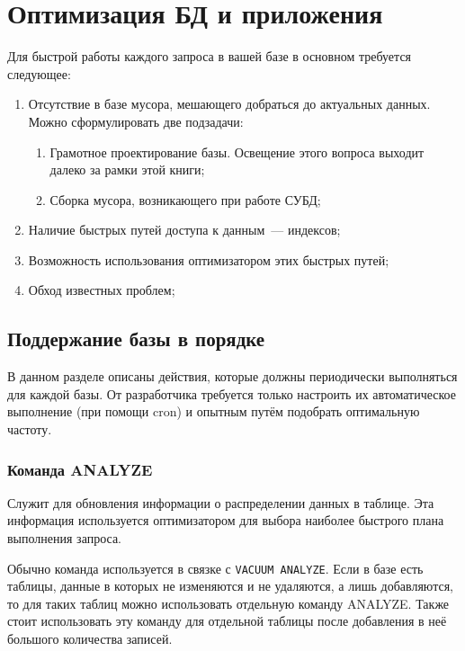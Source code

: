 \section{Оптимизация БД и приложения}

Для быстрой работы каждого запроса в вашей базе в основном требуется следующее:

\begin{enumerate}
  \item Отсутствие в базе мусора, мешающего добраться до актуальных данных. Можно сформулировать две подзадачи:
  \begin{enumerate}
    \item Грамотное проектирование базы. Освещение этого вопроса выходит далеко за рамки этой книги;
    \item Сборка мусора, возникающего при работе СУБД;
  \end{enumerate}
  \item Наличие быстрых путей доступа к данным~--- индексов;
  \item Возможность использования оптимизатором этих быстрых путей;
  \item Обход известных проблем;
\end{enumerate}


\subsection{Поддержание базы в порядке}

В данном разделе описаны действия, которые должны периодически выполняться для каждой базы. От разработчика требуется только настроить их автоматическое выполнение (при помощи cron) и опытным путём подобрать оптимальную частоту.


\subsubsection{Команда ANALYZE}

Служит для обновления информации о распределении данных в таблице. Эта информация используется оптимизатором для выбора наиболее быстрого плана выполнения запроса.

Обычно команда используется в связке с \lstinline!VACUUM ANALYZE!. Если в базе есть таблицы, данные в которых не изменяются и не удаляются, а лишь добавляются, то для таких таблиц можно использовать отдельную команду ANALYZE. Также стоит использовать эту команду для отдельной таблицы после добавления в неё большого количества записей.


